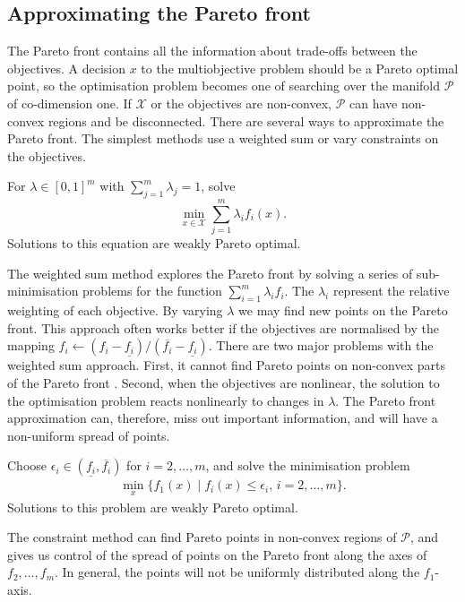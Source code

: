 \documentclass[main.tex]{subfiles}
\begin{document}
\subsection{Approximating the Pareto front}\label{sec:multi_pareto_front}
The Pareto front contains all the information about trade-offs between the
objectives. A decision $x$ to the multiobjective problem
should be a Pareto optimal point, so the
optimisation problem becomes one of searching over the manifold
$\mathcal{P}$ of co-dimension one. If $\mathcal{X}$ or the objectives are non-convex,
$\mathcal{P}$ can have non-convex regions and be
disconnected.
There are several ways to approximate the Pareto front. The simplest
methods use a weighted sum or vary constraints on the objectives.

\begin{mydef}
  For $\lambda \in {[0,1]}^m$ with $\sum_{j=1}^m\lambda_j = 1$, solve
  \begin{equation}
    \min_{x\in\mathcal{X}} \sum_{j=1}^m \lambda_i f_i(x).
  \end{equation}
  Solutions to this equation are weakly Pareto optimal.
\end{mydef}
The weighted sum method explores the Pareto front by solving a series
of sub-minimisation problems for the function $\sum_{i=1}^m\lambda_i f_i$.
The $\lambda_i$ represent the relative weighting of each
objective. By varying $\lambda$  we may find new points on the Pareto front.
This approach often works better if the objectives are normalised by the
mapping $f_i\leftarrow (f_i-\underline
{f_i})/(\overline{f_i}-\underline{f_i})$.
There are two major problems with the weighted sum approach. First,
it cannot find Pareto points on non-convex parts of the Pareto
front \citep{messac2000aggregate}.
Second, when the objectives are nonlinear, the solution to the
optimisation problem reacts nonlinearly to changes in $\lambda$.
The Pareto front approximation can, therefore, miss out important
information, and will
have a non-uniform spread of points.

\begin{mydef}
  Choose
  $\epsilon_i\in(\underline{f_i},\overline{f_i})$ for $i=2,\dots,m$, and
  solve the minimisation problem
  \begin{align}
    \min_x\{f_1(x)\mid f_i(x)\leq \epsilon_i,\, i=2,\dots,m\}.
  \end{align}
  Solutions to this problem are weakly Pareto optimal.
\end{mydef}
The constraint method can find Pareto points in non-convex regions of
$\mathcal{P}$, and gives us control of the spread of points on the Pareto front
along the axes of $f_2,\dots,f_m$. In general, the points will not be
uniformly distributed along the $f_1$-axis.
\end{document}

